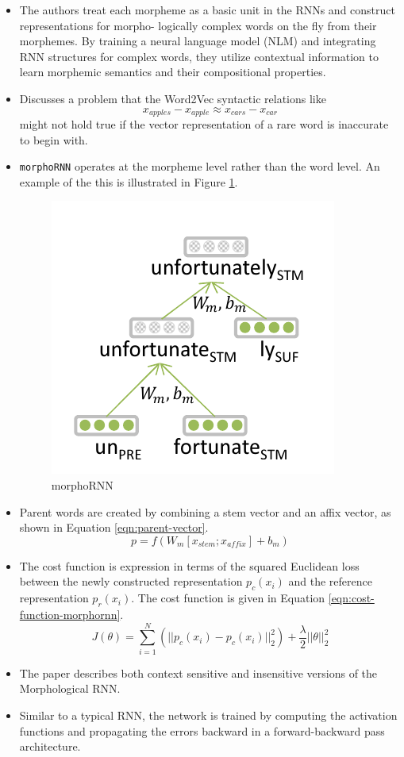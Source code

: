 \documentclass[11pt,a4paper]{article}
\begin{document}
  \begin{itemize}
    \item 
    The authors treat each morpheme as a basic unit in the RNNs and construct representations for morpho- logically complex words on the fly from their morphemes. By training a neural language model (NLM) and integrating RNN structures for complex words, they utilize contextual information to learn morphemic semantics and their compositional properties.
    \item 
    Discusses a problem that the Word2Vec syntactic relations like $$x_{apples} - x_{apple} \approx x_{cars} - x_{car}$$ might not hold true if the vector representation of a rare word is inaccurate to begin with.
    \item 
    \texttt{morphoRNN} operates at the morpheme level rather than the word level. An example of the this is illustrated in Figure \ref{fig:rnn-morphology}.
    \begin{figure}[ht]
      \centering
      \includegraphics[width=.4\textwidth]{rnn-morphology}
      \caption{morphoRNN}
      \label{fig:rnn-morphology}
    \end{figure}
    \item 
    Parent words are created by combining a stem vector and an affix vector, as shown in Equation \ref{eqn:parent-vector}.
    \begin{equation} \label{eqn:parent-vector}
      p = f (W_m [x_{stem} ; x_{affix}] + b_m)
    \end{equation}
    \item 
    The cost function is expression in terms of the squared Euclidean loss between the newly constructed representation $p_c(x_i)$ and the reference representation $p_r(x_i)$. The cost function is given in Equation \ref{eqn:cost-function-morphornn}.
    \begin{equation} \label{eqn:cost-function-morphornn}
      J(\theta) = \sum_{i=1}^N (|| p_c(x_i) - p_c(x_i) ||^2_2) + \frac{\lambda}{2} ||\theta||^2_2
    \end{equation}
    \item 
    The paper describes both context sensitive and insensitive versions of the Morphological RNN.
    \item 
    Similar to a typical RNN, the network is trained by computing the activation functions and propagating the errors backward in a forward-backward pass architecture.
  \end{itemize}
\end{document}
